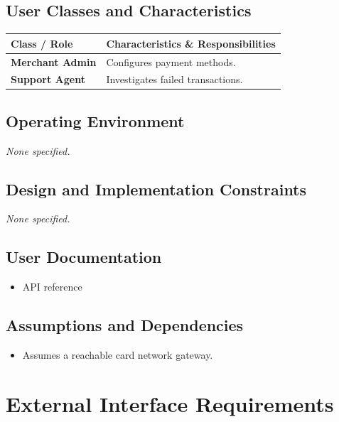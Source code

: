 \documentclass[11pt,a4paper]{article}
\begin{document}
\subsection{User Classes and Characteristics}
\begin{table}[h!]
\centering
\begin{tabularx}{\linewidth}{l X}
\toprule
\textbf{Class / Role} & \textbf{Characteristics \& Responsibilities} \\
\midrule
\textbf{Merchant Admin} & Configures payment methods. \\
\textbf{Support Agent} & Investigates failed transactions. \\
\bottomrule
\end{tabularx}
\end{table}

\subsection{Operating Environment}
\textit{None specified.}\par\vspace{6pt}

\subsection{Design and Implementation Constraints}
\textit{None specified.}\par\vspace{6pt}
\subsection{User Documentation}
\begin{itemize}[leftmargin=*]
    \item API reference
\end{itemize}

\subsection{Assumptions and Dependencies}
\begin{itemize}[leftmargin=*]
    \item Assumes a reachable card network gateway.
\end{itemize}

\section{External Interface Requirements}
\end{document}
